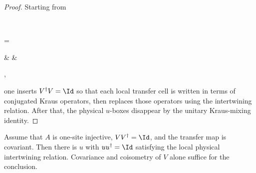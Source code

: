 \begin{proof}
    \leanok
    Starting from
    \begin{tenkzequation}
        \tenkzkernel
        \begin{tenkz}[rows={op,ket}, cols=1]
             \\
        \end{tenkz}
        =
        \begin{tenkz}[boundary=open]
             &  &
        \end{tenkz},
    \end{tenkzequation}
    one inserts $V^\dagger V = \Id$ so that each local transfer cell is
    written in terms of conjugated Kraus operators, then replaces those
    operators using the intertwining relation. After that, the physical
    $u$-boxes disappear by the unitary Kraus-mixing identity.
\end{proof}

\begin{lemma}%
    \label{thm:condC2_imp_condC1_of_injective}
    \leanok
    Assume that $A$ is one-site injective, $VV^\dagger=\Id$, and the
    transfer map is covariant.  Then there is $u$ with
    $uu^\dagger=\Id$ satisfying the local physical intertwining relation.
    Covariance and coisometry of $V$ alone suffice for the conclusion.
\end{lemma}

